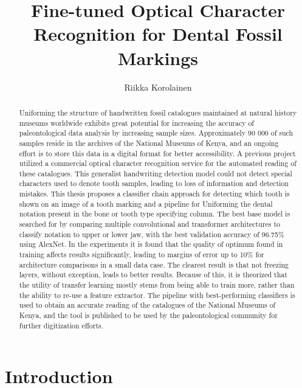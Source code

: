 \documentclass[english,twoside,openright]{UH_DS_MSc}
\title{Fine-tuned Optical Character Recognition for Dental Fossil Markings}
\author{Riikka Korolainen}
\date{\thesisdate}
\begin{document}
\maketitle

\begin{abstract}

Uniforming the structure of handwritten fossil catalogues maintained at natural history museums
worldwide exhibits great potential for increasing the accuracy of paleontological data analysis
by increasing sample sizes. Approximately 90 000 of such samples reside in the archives of the
National Museums of Kenya, and an ongoing effort is to store this data in a digital format for
better accessibility. A previous project utilized a commercial optical character recognition service
for the automated reading of these catalogues. This generalist handwriting detection model could not detect special characters used to denote tooth samples, leading to loss of information and
detection mistakes.
This thesis proposes a classifier chain approach for detecting which tooth is shown on an image of
a tooth marking and a pipeline for Uniforming the dental notation present in the bone or tooth
type specifying column. The best base model is searched for by comparing multiple convolutional
and transformer architectures to classify notation to upper or lower jaw, with the best validation
accuracy of 96.75\% using AlexNet. In the experiments it is found that the quality of optimum found
in training affects results significantly, leading to margins of error up to 10\% for architecture
comparisons in a small data case. The clearest result is that not freezing layers, without exception,
leads to better results. Because of this, it is theorized that the utility of transfer learning mostly
stems from being able to train more, rather than the ability to re-use a feature extractor. The
pipeline with best-performing classifiers is used to obtain an accurate reading of the catalogues
of the National Museums of Kenya, and the tool is published to be used by the paleontological
community for further digitization efforts.

\end{abstract}

\mytableofcontents

\mynomenclature

\chapter{Introduction}
\end{document}
